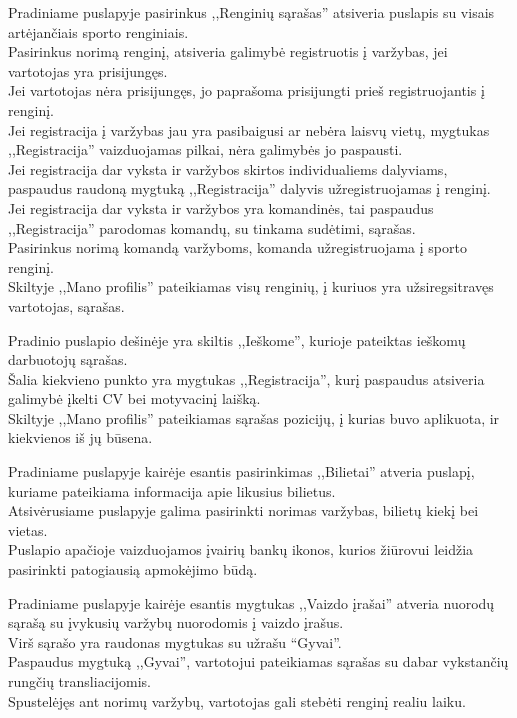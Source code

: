 \documentclass{VUMIFPSkursinis}
\begin{document}
\begin{longtabu}
    {
      Pradiniame puslapyje pasirinkus ,,Renginių sąrašas'' atsiveria puslapis su visais artėjančiais sporto renginiais. \\
      Pasirinkus norimą renginį, atsiveria galimybė registruotis į varžybas, jei vartotojas yra prisijungęs. \\
      Jei vartotojas nėra prisijungęs, jo paprašoma prisijungti prieš registruojantis į renginį. \\
      Jei registracija į varžybas jau yra pasibaigusi ar nebėra laisvų vietų, mygtukas ,,Registracija'' vaizduojamas pilkai, nėra galimybės jo paspausti. \\
      Jei registracija dar vyksta ir varžybos skirtos individualiems dalyviams, paspaudus raudoną mygtuką ,,Registracija'' dalyvis užregistruojamas į renginį. \\
      Jei registracija dar vyksta ir varžybos yra komandinės, tai paspaudus ,,Registracija'' parodomas komandų, su tinkama sudėtimi, sąrašas. \\
      Pasirinkus norimą komandą varžyboms, komanda užregistruojama į sporto renginį. \\
      Skiltyje ,,Mano profilis'' pateikiamas visų renginių, į kuriuos yra užsiregsitravęs vartotojas, sąrašas.
    }
    
    {
      Pradinio puslapio dešinėje yra skiltis ,,Ieškome'', kurioje pateiktas ieškomų darbuotojų sąrašas. \\
      Šalia kiekvieno punkto yra mygtukas ,,Registracija'', kurį paspaudus atsiveria galimybė įkelti CV bei motyvacinį laišką. \\
      Skiltyje ,,Mano profilis'' pateikiamas sąrašas pozicijų, į kurias buvo aplikuota, ir kiekvienos iš jų būsena.
    }
    
    {
      Pradiniame puslapyje kairėje esantis pasirinkimas ,,Bilietai'' atveria puslapį, kuriame pateikiama informacija apie likusius bilietus. \\
      Atsivėrusiame puslapyje galima pasirinkti norimas varžybas, bilietų kiekį bei vietas. \\
      Puslapio apačioje vaizduojamos įvairių bankų ikonos, kurios žiūrovui leidžia pasirinkti patogiausią apmokėjimo būdą.
    }
    
    {
      Pradiniame puslapyje kairėje esantis mygtukas ,,Vaizdo įrašai'' atveria nuorodų sąrašą su įvykusių varžybų nuorodomis į vaizdo įrašus. \\
      Virš sąrašo yra raudonas mygtukas su užrašu “Gyvai”. \\
      Paspaudus mygtuką ,,Gyvai'', vartotojui pateikiamas sąrašas su dabar vykstančių rungčių transliacijomis. \\
      Spustelėjęs ant norimų varžybų, vartotojas gali stebėti renginį realiu laiku. \\
    }
    

\end{longtabu}
\end{document}
